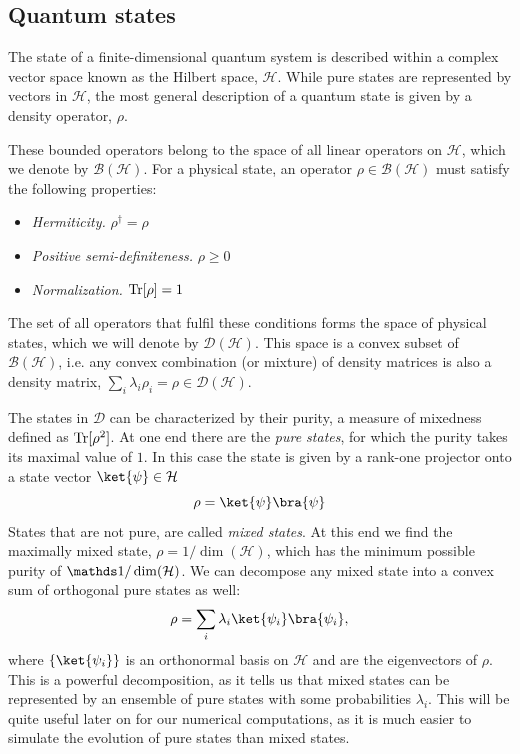\smallskip
\label{sec:quantum-states}
\subsection{Quantum states} The state of a finite-dimensional quantum system is described within a complex vector space known as the Hilbert space, $\mathcal{H}$. While pure states are represented by vectors in $\mathcal{H}$, the most general description of a quantum state is given by a density operator, $\rho$.

These bounded operators belong to the space of all linear operators on $\mathcal{H}$, which we denote by $\mathcal{B}(\mathcal{H})$. For a physical state, an operator $\rho \in \mathcal{B}(\mathcal{H})$ must satisfy the following properties:
\begin{itemize}
    \item \textit{Hermiticity.} $\rho^\dagger = \rho$
    \item \textit{Positive semi-definiteness.} $\rho \geq 0$
    \item \textit{Normalization.} $\operatorname{Tr}[\rho] = 1$
\end{itemize}
The set of all operators that fulfil these conditions forms the space of physical states, which we will denote by $\mathcal{D}(\mathcal{H})$. This space is a convex subset of $\mathcal{B}(\mathcal{H})$, i.e. any convex combination (or mixture) of density matrices is also a density matrix, $\sum_i \lambda_i \rho_i = \rho \in \mathcal{D}(\mathcal{H}).$

The states in $\mathcal{D}$ can be characterized by their purity, a measure of mixedness defined as $\operatorname{Tr} [\rho^2]$. At one end there are the \textit{pure states}, for which the purity takes its maximal value of $1$. In this case the state is given by a rank-one projector onto a state vector $\ket{\psi} \in \mathcal{H}$
$$
\rho = \ket{\psi}\bra{\psi}
$$
States that are not pure, are called \textit{mixed states}. At this end we find the maximally mixed state, $\rho = 1 / \dim(\mathcal{H})$, which has the minimum possible purity of $\idm / \dim(\mathcal{H})$.
We can decompose any mixed state into a convex sum of orthogonal pure states as well:
\begin{equation}
    \rho = \sum_i \lambda_i \ket{\psi_i} \bra{\psi_i},
\end{equation}
where $\{\ket{\psi_i}\}$ is an orthonormal basis on $\mathcal{H}$ and are the eigenvectors of $\rho$. This is a powerful decomposition, as it tells us that mixed states can be represented by an ensemble of pure states with some probabilities $\lambda_i$. This will be quite useful later on for our numerical computations, as it is much easier to simulate the evolution of pure states than mixed states.

